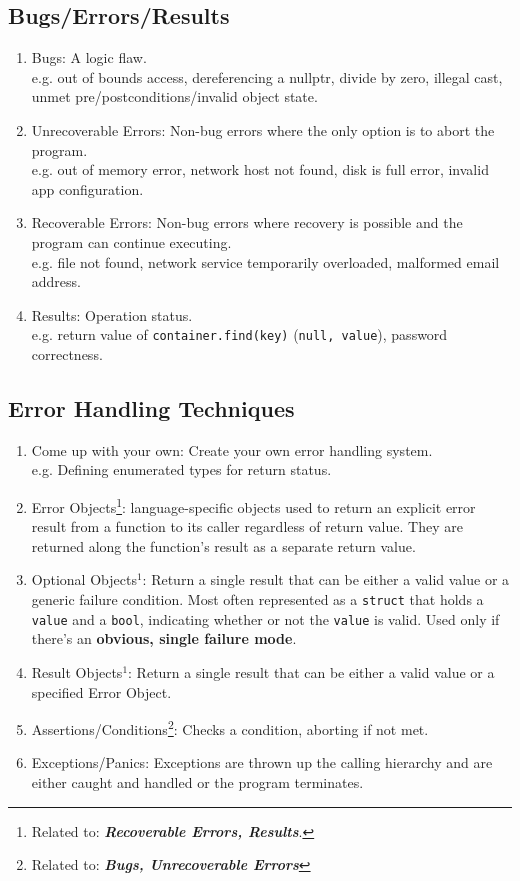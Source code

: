 \documentclass{article}
\begin{document}
\subsection{Bugs/Errors/Results}
\begin{enumerate}[label=(\roman*)]
\item Bugs: A logic flaw. \\
  e.g. out of bounds access, dereferencing a nullptr, divide by zero,
  illegal cast, unmet pre/postconditions/invalid object state. 
\item Unrecoverable Errors: Non-bug errors where the only option is to
  abort the program. \\
  e.g. out of memory error, network host not found, disk is full
  error, invalid app configuration. 
\item Recoverable Errors: Non-bug errors where recovery is possible
  and the program can continue executing. \\
  e.g. file not found, network service temporarily overloaded,
  malformed email address.
\item Results: Operation status. \\
  e.g. return value of \texttt{container.find(key)} (\texttt{null,
    value}), password correctness.
\end{enumerate}

\subsection{Error Handling Techniques}
\begin{enumerate}[label=(\roman*)]
\item Come up with your own: Create your own error handling system. \\
  e.g. Defining enumerated types for return status.
\item Error Objects\footnote{Related to:
    \textit{\textbf{Recoverable Errors, Results}}.}: language-specific
  objects used to return an explicit error result from a function to its
  caller regardless of return value. They are returned along the
  function's result as a separate return value. 
\item Optional Objects$^1$: Return a single
  result that can be either a valid value or a generic failure
  condition. Most often represented as a \texttt{struct} that holds a
  \texttt{value} and a \texttt{bool}, indicating whether or not the
  \texttt{value} is valid. Used only if there's an \textbf{obvious, single
  failure mode}.
\item Result Objects$^1$: Return a single result that can be either a
  valid value or a specified Error Object.
\item Assertions/Conditions\footnote{Related to: \textit{\textbf{Bugs,
        Unrecoverable Errors}}}: Checks a condition, aborting if not met.
\item Exceptions/Panics: Exceptions are thrown up the calling
  hierarchy and are either caught and handled or the program terminates.
\end{enumerate}
\end{document}
